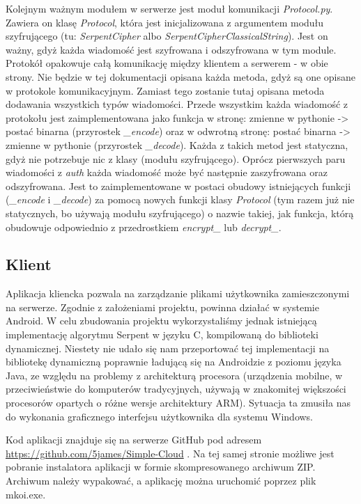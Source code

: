 \documentclass{article}
\begin{document}
	Kolejnym ważnym modułem w serwerze jest moduł komunikacji \textit{Protocol.py}. Zawiera on klasę \textit{Protocol}, która jest inicjalizowana z argumentem modułu szyfrującego (tu: \textit{SerpentCipher} albo \textit{SerpentCipherClassicalString}). Jest on ważny, gdyż każda wiadomość jest szyfrowana i odszyfrowana w tym module. Protokół opakowuje całą komunikację między klientem a serwerem - w obie strony. Nie będzie w tej dokumentacji opisana każda metoda, gdyż są one opisane w protokole komunikacyjnym. Zamiast tego zostanie tutaj opisana metoda dodawania wszystkich typów wiadomości. Przede wszystkim każda wiadomość z protokołu jest zaimplementowana jako funkcja w stronę: zmienne w pythonie -> postać binarna (przyrostek \textit{_encode}) oraz w odwrotną stronę: postać binarna -> zmienne w pythonie (przyrostek \textit{_decode}). Każda z takich metod jest statyczna, gdyż nie potrzebuje nic z klasy (modułu szyfrującego). Oprócz pierwszych paru wiadomości z \textit{auth} każda wiadomość może być następnie zaszyfrowana oraz odszyfrowana. Jest to zaimplementowane w postaci obudowy istniejących funkcji (\textit{_encode} i \textit{_decode}) za pomocą nowych funkcji klasy \textit{Protocol} (tym razem już nie statycznych, bo używają modułu szyfrującego) o nazwie takiej, jak funkcja, którą obudowuje odpowiednio z przedrostkiem \textit{encrypt_} lub \textit{decrypt_}.
	
	\subsection{Klient}
	Aplikacja kliencka pozwala na zarządzanie plikami użytkownika zamieszczonymi na serwerze. Zgodnie z założeniami projektu, powinna działać w systemie Android. W celu zbudowania projektu wykorzystaliśmy jednak istniejącą implementację algorytmu Serpent w języku C, kompilowaną do biblioteki dynamicznej. Niestety nie udało się nam przeportować tej implementacji na bibliotekę dynamiczną poprawnie ładującą się na Androidzie z poziomu języka Java, ze względu na problemy z architekturą procesora (urządzenia mobilne, w przeciwieństwie do komputerów tradycyjnych, używają w znakomitej większości procesorów opartych o różne wersje architektury ARM). Sytuacja ta zmusiła nas do wykonania graficznego interfejsu użytkownika dla systemu Windows. 
	
	Kod aplikacji znajduje się na serwerze GitHub pod adresem \url{https://github.com/5james/Simple-Cloud} . Na tej samej stronie możliwe jest pobranie instalatora aplikacji w formie skompresowanego archiwum ZIP. Archiwum należy wypakować, a aplikację można uruchomić poprzez plik mkoi.exe. 
	
\end{document}
